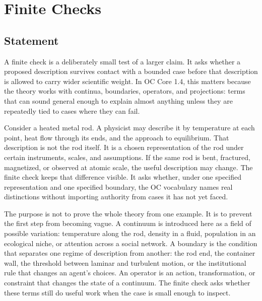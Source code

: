 \documentclass[11pt,a4paper,openany]{book}
\begin{document}
\section{Finite Checks}
\subsection{Statement}
A finite check is a deliberately small test of a larger claim. It asks whether a proposed description survives contact with a bounded case before that description is allowed to carry wider scientific weight. In OC Core 1.4, this matters because the theory works with continua, boundaries, operators, and projections: terms that can sound general enough to explain almost anything unless they are repeatedly tied to cases where they can fail. \cite{kadanoff_scaling,wilson_renormalization}\par
Consider a heated metal rod. A physicist may describe it by temperature at each point, heat flow through its ends, and the approach to equilibrium. That description is not the rod itself. It is a chosen representation of the rod under certain instruments, scales, and assumptions. If the same rod is bent, fractured, magnetized, or observed at atomic scale, the useful description may change. The finite check keeps that difference visible. It asks whether, under one specified representation and one specified boundary, the OC vocabulary names real distinctions without importing authority from cases it has not yet faced.\par
The purpose is not to prove the whole theory from one example. It is to prevent the first step from becoming vague. A continuum is introduced here as a field of possible variation: temperature along the rod, density in a fluid, population in an ecological niche, or attention across a social network. A boundary is the condition that separates one regime of description from another: the rod end, the container wall, the threshold between laminar and turbulent motion, or the institutional rule that changes an agent's choices. An operator is an action, transformation, or constraint that changes the state of a continuum. The finite check asks whether these terms still do useful work when the case is small enough to inspect.\par
\end{document}
